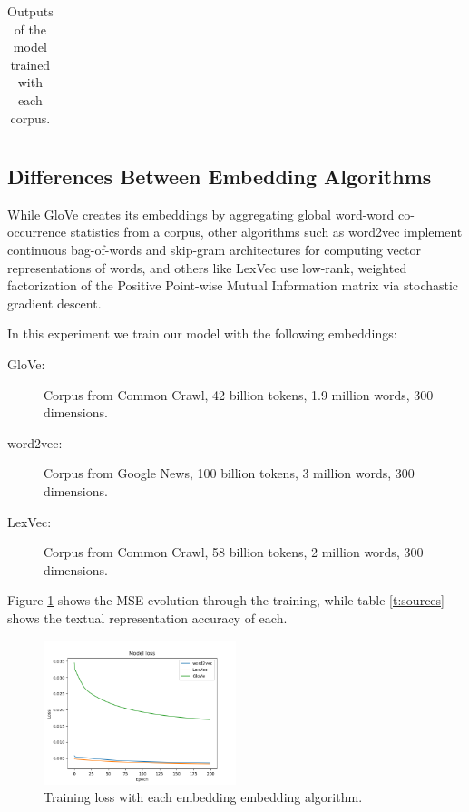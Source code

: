 \documentclass[]{article}
\begin{document}
\begin{table}[H]
\begin{tabular}{@{}cccc@{}}
		\end{tabular}
		\caption{Outputs of the model trained with each corpus.}
		\label{t:corpus2}
	\end{table}
	
	\subsection{Differences Between Embedding Algorithms}
	
	While GloVe creates its embeddings by aggregating global word-word co-occurrence statistics from a corpus, other algorithms such as word2vec implement continuous bag-of-words and skip-gram architectures for computing vector representations of words, and others like LexVec use low-rank, weighted factorization of the Positive Point-wise Mutual Information matrix via stochastic gradient descent.
	
	In this experiment we train our model with the following embeddings:
	
	\begin{description}
		\item[GloVe:] Corpus from Common Crawl, 42 billion tokens, 1.9 million words, 300 dimensions.
		\item[word2vec:] Corpus from Google News, 100 billion tokens, 3 million words, 300 dimensions.
		\item[LexVec:] Corpus from Common Crawl, 58 billion tokens, 2 million words, 300 dimensions.
	\end{description}
	
	Figure \ref{f:sources} shows the MSE evolution through the training, while table \ref{t:sources} shows the textual representation accuracy of each.
	
	\begin{figure}[H]
		\centering
		\includegraphics[width=0.5\textwidth]{sources}
		\caption{Training loss with each embedding embedding algorithm.}
		\label{f:sources}
	\end{figure}
	
\end{document}
